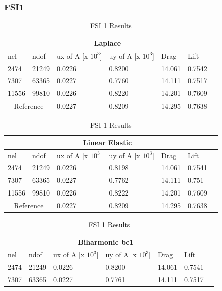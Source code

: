 \newpage
\subsubsection{FSI1}


\begin{table}[h!]
\centering
\caption{FSI 1 Results}
\label{FSI1 Results}
\begin{tabular}{ |p{1cm}||p{1cm}|p{2.5cm}|p{2.5cm}|p{2.7cm}|p{2.7cm}|p{1.2cm}|}
 \hline
  \multicolumn{6}{|c|}{Laplace} \\
   \hline
nel & ndof & ux of A [x $10^{3}$]  &uy of A [x $10^{3}$]& Drag  & Lift \\
 \hline
 2474    & 21249  &       0.0226 &       0.8200 & 14.061 & 0.7542 \\
 7307    & 63365  &       0.0227 &       0.7760 & 14.111 & 0.7517 \\
 11556   & 99810  &       0.0226 &      0.8220 & 14.201 & 0.7609 \\
  \hline
 \multicolumn{2}{|c|}{Reference} &  0.0227      &       0.8209      & 14.295  & 0.7638   \\
 \hline
\end{tabular}
\begin{tabular}{ |p{1cm}||p{1cm}|p{2.5cm}|p{2.5cm}|p{2.7cm}|p{2.7cm}|p{1.2cm}|}
 \hline
  \multicolumn{6}{|c|}{Linear Elastic} \\
   \hline
nel & ndof & ux of A [x $10^{3}$]  &uy of A [x $10^{3}$]& Drag  & Lift \\
 \hline
 2474    & 21249  &       0.0226 &       0.8198 & 14.061 & 0.7541 \\
 7307    & 63365  &       0.0227 &       0.7762 & 14.111 & 0.751  \\
 11556   & 99810  &       0.0226  &       0.8222 & 14.201 & 0.7609 \\
  \hline
 \multicolumn{2}{|c|}{Reference} &  0.0227      &       0.8209      & 14.295  & 0.7638   \\
 \hline
\end{tabular}
\begin{tabular}{ |p{1cm}||p{1cm}|p{2.5cm}|p{2.5cm}|p{2.7cm}|p{2.7cm}|p{1.2cm}|}
 \hline
  \multicolumn{6}{|c|}{Biharmonic bc1} \\
   \hline
nel & ndof & ux of A [x $10^{3}$]  &uy of A [x $10^{3}$]& Drag  & Lift \\
 \hline
 2474    & 21249  &       0.0226 &       0.8200 & 14.061 & 0.7541 \\
 7307    & 63365  &       0.0227  &       0.7761 & 14.111 & 0.7517 \\

\end{tabular}
\end{table}

